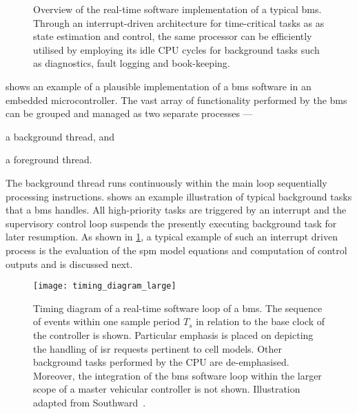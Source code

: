 \begin{figure}[!tbp]
{\begin{subfigure}[t]{\wd\algboxA}
            \usebox{\algboxA}
        \end{subfigure}
        \hfill
        \begin{subfigure}[t]{\wd\algboxB}
            \label{subfig:fgRTprocess}
            \raisebox{\dimexpr.5\ht\algboxA-.5\ht\algboxB}{%
                \usebox{\algboxB}%
            }%
        \end{subfigure}
    }
    \caption[Overview of real-time software implementation of a typical
    ]{Overview of the real-time software implementation of a typical
        \gls{bms}. Through an interrupt-driven architecture for time-critical tasks as
        as state estimation and control, the same processor can be
        efficiently utilised by employing its idle CPU cycles for background
    tasks such as diagnostics, fault logging and book-keeping.}
    \label{fig:basicRTCsoftwarearch}
\end{figure}

 shows  an example of a  plausible implementation
of  a \gls{bms}  software  in an  embedded microcontroller.  The  vast array  of
functionality  performed by  the \gls{bms}  can be  grouped and  managed as  two
separate processes ---
\begin{enumerate*}[label=\roman*)]
    \item a background thread, and
    \item a foreground thread.
\end{enumerate*}
The  background  thread runs  continuously  within  the main  loop  sequentially
processing instructions.  shows an example illustration
of typical  background tasks that  a \gls{bms} handles. All  high-priority tasks
are  triggered  by  an  interrupt  and the  supervisory  control  loop  suspends
the  presently executing  background  task  for later  resumption.  As shown  in
\cref{subfig:fgRTprocess}, a typical example of such an interrupt driven process
is the  evaluation of the \gls{spm}  model equations and computation  of control
outputs and is discussed next.

\begin{figure}[!tbp]
    \centering
    \texttt{[image: timing\_diagram\_large]}
    \caption[Timing diagram of a real-time software loop of a ]
    {Timing diagram of a real-time software loop of a \gls{bms}. The sequence of
        events within one sample period $T_s$ in relation to the base clock of
        the controller is shown. Particular emphasis is placed on depicting the
        handling of \gls{isr} requests pertinent to cell models. Other
        background tasks performed by the CPU are de-emphasised. Moreover, the
        integration of the  \gls{bms} software loop within  the larger  scope of
        a master  vehicular controller is not shown. Illustration adapted from
    Southward~\cite{Southward2011}.}
    \label{fig:timingdiagramBig}
\end{figure}


